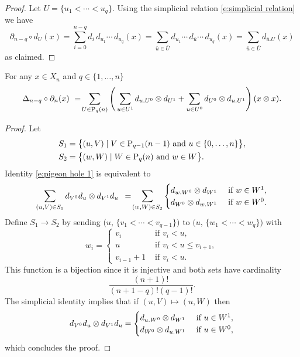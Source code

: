 \begin{proof}
	Let $U = \{u_1 < \cdots < u_q\}$. Using the simplicial relation \eqref{e:simplicial relation} we have
	\begin{equation*}
	\partial_{n-q} \circ d_U(x) =
	\sum_{i=0}^{n-q} d_i\, d_{u_1} \cdots\, d_{u_q}(x) =
	\sum_{\bar{u} \in \overline{U}} d_{u_1} \cdots\, d_{\bar{u}} \cdots\, d_{u_q}(x) =
	\sum_{\bar{u} \in \overline{U}} d_{\bar{u}.U}(x)
	\end{equation*}
	as claimed.
\end{proof}

\begin{lemma} \label{l:pigeon hole}
	For any $x \in X_n$ and $q \in \{1, \dots, n\}$
	\begin{equation} \label{e:pigeon hole 1}
	\Delta_{n-q} \circ \partial_n (x)\ =\!
	\sum_{U \in \P_q(n)} \left( \,
	\sum_{u \in U^1} d_{u.U^0} \ot d_{U^1} +
	\sum_{u \in U^0} d_{U^0} \ot d_{u.U^1} \right)(x \ot x).
	\end{equation}
\end{lemma}

\begin{proof}
	Let
	\begin{align*}
	& S_1 = \big\{ (u, V)\mid V \in \P_{q-1}(n-1) \text{ and } u \in \{0,\dots,n\} \big\}, \\
	& S_2 = \big\{ (w, W)\mid W \in \P_{q}(n) \text{ and } w \in W \big\}.
	\end{align*}
	Identity \eqref{e:pigeon hole 1} is equivalent to
	\begin{equation} \label{e:pigeon hole 2}
	\sum_{(u, V) \in S_1} d_{V^0}d_u \ot d_{V^1}d_u \ \, = \!
	\sum_{(w, W) \in S_2}
	\begin{cases}
	d_{w.W^0} \ot d_{W^1} & \text{ if } w \in W^1, \\
	d_{W^0} \ot d_{w.W^1} & \text{ if } w \in W^0.
	\end{cases}
	\end{equation}
	Define $S_1 \to S_2$ by sending $\big(u,\, \{v_1 < \cdots < v_{q-1}\} \big)$ to $\big(u,\, \{w_1 < \cdots < w_{q}\} \big)$ with
	\begin{equation*}
	w_i =
	\begin{cases}
	v_i & \text{ if } v_i < u, \\
	u & \text{ if } v_i < u \leq v_{i+1}, \\
	v_{i-1}+1 & \text{ if } v_i < u.
	\end{cases}
	\end{equation*}
	This function is a bijection since it is injective and both sets have cardinality
	\begin{equation*}
	\frac{(n+1)!}{(n+1-q)!(q-1)!}.
	\end{equation*}
	The simplicial identity implies that if $(u, V) \mapsto (u, W)$ then
	\begin{equation*}
	d_{V^0}d_u \ot d_{V^1}d_u =
	\begin{cases}
	d_{u.W^0} \ot d_{W^1} & \text{ if } u \in W^1, \\
	d_{W^0} \ot d_{u.W^1} & \text{ if } u \in W^0,
	\end{cases}
	\end{equation*}
	which concludes the proof.
\end{proof}


